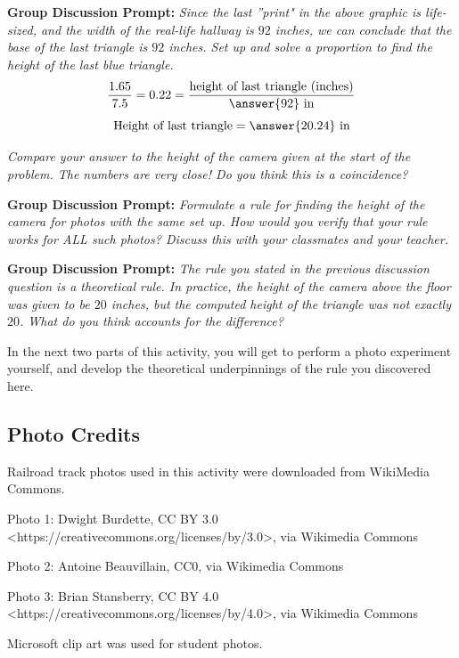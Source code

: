 \documentclass{ximera}
\begin{document}
\begin{exploration}
\textbf{Group Discussion Prompt:}
    \emph{Since the last ''print" in the above graphic is life-sized, and the width of the real-life hallway is $92$ inches, we can conclude that the base of the last triangle is $92$ inches. 
    Set up and solve a proportion to find the height of the last blue triangle.}  
    $$\frac{1.65}{7.5}=0.22=\frac{\text{height of last triangle (inches)}}{\answer{92}~\text{in}}$$
    $$\text{Height of last triangle}=\answer{20.24}~\text{in}$$

   \emph{Compare your answer to the height of the camera given at the start of the problem.  The numbers are very close!  Do you think this is a coincidence?}  

\textbf{Group Discussion Prompt:}
    \emph{Formulate a rule for finding the height of the camera for photos with the same set up.  How would you verify that your rule works for ALL such photos?  Discuss this with your classmates and your teacher.}
    
\textbf{Group Discussion Prompt:}
    \emph{The rule you stated in the previous discussion question is a theoretical rule.  In practice, the height of the camera above the floor was given to be $20$ inches, but the computed height of the triangle was not exactly $20$.  What do you think accounts for the difference?}  
\end{exploration}

In the next two parts of this activity, you will get to perform a photo experiment yourself, and develop the theoretical underpinnings of the rule you discovered here.

\subsection*{Photo Credits}

Railroad track photos used in this activity were downloaded from WikiMedia Commons.  

Photo 1: Dwight Burdette, CC BY 3.0 <https://creativecommons.org/licenses/by/3.0>, via Wikimedia Commons

Photo 2: Antoine Beauvillain, CC0, via Wikimedia Commons

Photo 3: Brian Stansberry, CC BY 4.0 <https://creativecommons.org/licenses/by/4.0>, via Wikimedia Commons

Microsoft clip art was used for student photos.
\end{document}
